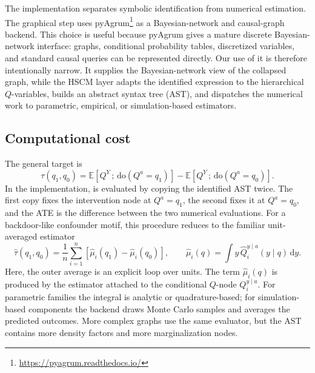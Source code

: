 \documentclass[12pt]{article}
\newcommand{\E}[1]{\mathbb{E}\left[ #1 \right]}
\newcommand{\rmdo}{\mathrm{do}}
\newcommand{\s}{\, ; \,}
\newcommand{\di}{\mathrm{d}}
\begin{document}
The implementation separates symbolic identification from numerical
estimation. The graphical step uses pyAgrum\footnote{\url{https://pyagrum.readthedocs.io/}}
as a Bayesian-network and causal-graph backend. This choice is useful
because pyAgrum gives a mature discrete Bayesian-network interface:
graphs, conditional probability tables, discretized variables, and
standard causal queries can be represented directly. Our use of it is
therefore intentionally narrow. It supplies the Bayesian-network view of
the collapsed graph, while the HSCM layer adapts the identified
expression to the hierarchical $Q$-variables, builds an abstract syntax
tree (AST), and dispatches the numerical work to parametric, empirical,
or simulation-based estimators.

\subsection{Computational cost}
\label{sec:computational_cost}

The general target is
\begin{equation}
  \tau(q_1,q_0)
  =
  \E{Q^Y \s \rmdo(Q^a=q_1)}
  -
  \E{Q^Y \s \rmdo(Q^a=q_0)}.
  \label{eq:software_ate}
\end{equation}
In the implementation,  is evaluated by copying
the identified AST twice. The first copy fixes the intervention node at
$Q^a=q_1$, the second fixes it at $Q^a=q_0$, and the ATE is the
difference between the two numerical evaluations. For a backdoor-like
confounder motif, this procedure reduces to the familiar unit-averaged
estimator
\begin{equation}
  \hat{\tau}(q_1,q_0)
  =
  \frac{1}{n}
  \sum_{i=1}^{n}
  \left[\hat{\mu}_i(q_1)-\hat{\mu}_i(q_0)\right],
  \qquad
  \hat{\mu}_i(q)=
  \int y\,\hat{Q}^{y\mid a}_i(y\mid q)\,\di y.
  \label{eq:software_unit_average}
\end{equation}
Here, the outer average is an explicit loop over units. The term
$\hat{\mu}_i(q)$ is produced by the estimator attached to the
conditional $Q$-node $Q^{y\mid a}_i$. For parametric families the
integral is analytic or quadrature-based; for simulation-based
components the backend draws Monte Carlo samples and averages the
predicted outcomes. More complex graphs use the same evaluator, but the
AST contains more density factors and more marginalization nodes.
\end{document}
